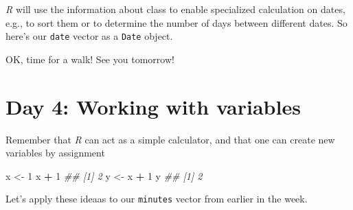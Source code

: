 \documentclass[]{book}
\newenvironment{Shaded}{\begin{snugshade}}{\end{snugshade}}
\newcommand{\CommentTok}[1]{\textcolor[rgb]{0.56,0.35,0.01}{\textit{#1}}}
\newcommand{\DataTypeTok}[1]{\textcolor[rgb]{0.13,0.29,0.53}{#1}}
\newcommand{\DecValTok}[1]{\textcolor[rgb]{0.00,0.00,0.81}{#1}}
\newcommand{\KeywordTok}[1]{\textcolor[rgb]{0.13,0.29,0.53}{\textbf{#1}}}
\newcommand{\NormalTok}[1]{#1}
\newcommand{\OperatorTok}[1]{\textcolor[rgb]{0.81,0.36,0.00}{\textbf{#1}}}
\newcommand{\StringTok}[1]{\textcolor[rgb]{0.31,0.60,0.02}{#1}}
\begin{document}
\begin{Shaded}
\end{Shaded}

\emph{R} will use the information about class to enable specialized calculation on dates, e.g., to sort them or to determine the number of days between different dates. So here's our \texttt{date} vector as a \texttt{Date} object.

\begin{Shaded}
\end{Shaded}

OK, time for a walk! See you tomorrow!

\hypertarget{day-4-working-with-variables}{%
\section{Day 4: Working with variables}\label{day-4-working-with-variables}}

Remember that \emph{R} can act as a simple calculator, and that one can create new variables by assignment

\begin{Shaded}
\begin{Highlighting}[]
\NormalTok{x <-}\StringTok{ }\DecValTok{1}
\NormalTok{x }\OperatorTok{+}\StringTok{ }\DecValTok{1}
\CommentTok{## [1] 2}
\NormalTok{y <-}\StringTok{ }\NormalTok{x }\OperatorTok{+}\StringTok{ }\DecValTok{1}
\NormalTok{y}
\CommentTok{## [1] 2}
\end{Highlighting}
\end{Shaded}

Let's apply these ideaas to our \texttt{minutes} vector from earlier in the week.
\end{document}
